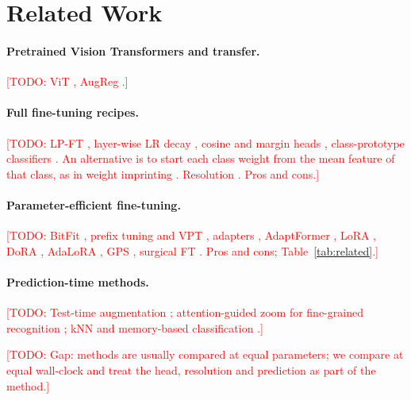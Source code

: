 \documentclass{article} %
\newcommand{\todo}[1]{\textcolor{red}{[TODO: #1]}}
\begin{document}
\section{Related Work}
\label{sec:related}

\paragraph{Pretrained Vision Transformers and transfer.}
\todo{ViT \citep{dosovitskiy2021vit}, AugReg \citep{steiner2022augreg}.}

\paragraph{Full fine-tuning recipes.}
\todo{LP-FT \citep{kumar2022lpft}, layer-wise LR decay \citep{bao2022beit,he2022mae},
cosine and margin heads \citep{wang2018cosface}, class-prototype classifiers
\citep{mensink2013ncm,snell2017protonet}. An alternative is to start each class weight from
the mean feature of that class, as in weight imprinting \citep{qi2018imprinting}. Resolution \citep{touvron2019fixres}.
Pros and cons.}

\paragraph{Parameter-efficient fine-tuning.}
\todo{BitFit \citep{zaken2022bitfit}, prefix tuning and VPT \citep{li2021prefix,jia2022vpt},
adapters \citep{houlsby2019adapter}, AdaptFormer \citep{chen2022adaptformer},
LoRA \citep{hu2022lora}, DoRA \citep{liu2024dora}, AdaLoRA \citep{zhang2023adalora},
GPS \citep{zhang2024gps}, surgical FT \citep{lee2023surgical}.
Pros and cons; Table~\ref{tab:related}.}

\paragraph{Prediction-time methods.}
\todo{Test-time augmentation \citep{krizhevsky2012imagenet}; attention-guided zoom for fine-grained recognition
\citep{fu2017racnn,hu2019wsdan}; kNN and memory-based classification
\citep{nakata2022knn,wu2018instance,khandelwal2020knnlm}.}

\todo{Gap: methods are usually compared at equal parameters; we compare at equal
wall-clock and treat the head, resolution and prediction as part of the method.}

\end{document}
